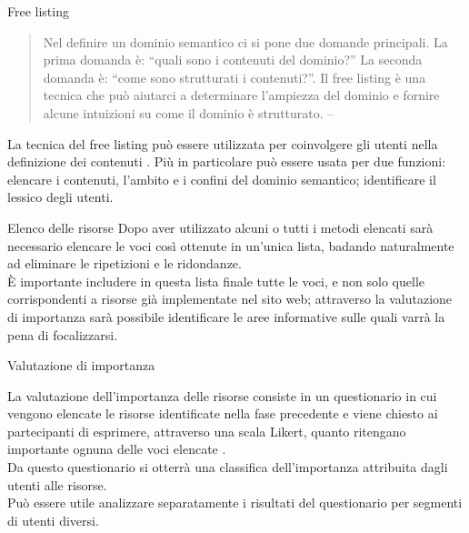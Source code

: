 \documentclass[pdf,mpa]{prosper}
\begin{document}
\begin{slide}{Free listing}
\begin{quote}
Nel definire un dominio semantico ci si pone due domande principali. La prima domanda è: ``quali sono i contenuti del dominio?'' La seconda domanda è: ``come sono strutturati i contenuti?''. Il free listing è una tecnica che può aiutarci a determinare l'ampiezza del dominio e fornire alcune intuizioni su come il dominio è strutturato. -- \cite{Sinha2003}
\end{quote} 

La tecnica del free listing può essere utilizzata per coinvolgere gli utenti nella definizione dei contenuti \citep{Coxon1999}. Più in particolare può essere usata per due funzioni: elencare i contenuti, l'ambito e i confini del dominio semantico; identificare il lessico degli utenti.

\end{slide}

\begin{slide}{Elenco delle risorse}
Dopo aver utilizzato alcuni o tutti i metodi elencati sarà necessario elencare le voci così ottenute in un'unica lista, badando naturalmente ad eliminare le ripetizioni e le ridondanze.\\

È importante includere in questa lista finale tutte le voci, e non solo quelle corrispondenti a risorse già implementate nel sito web; attraverso la valutazione di importanza sarà possibile identificare le aree informative sulle quali varrà la pena di focalizzarsi.
\end{slide}

\begin{slide}{Valutazione di importanza}

La valutazione dell'importanza delle risorse consiste in un questionario in cui vengono elencate le risorse identificate nella fase precedente e viene chiesto ai partecipanti di esprimere, attraverso una scala Likert, quanto ritengano importante ognuna delle voci elencate \citep{RuggMcGeorge1997}.\\

Da questo questionario si otterrà una classifica dell'importanza attribuita dagli utenti alle risorse.\\
Può essere utile analizzare separatamente i risultati del questionario per segmenti di utenti diversi.

\end{slide}
\end{document}
